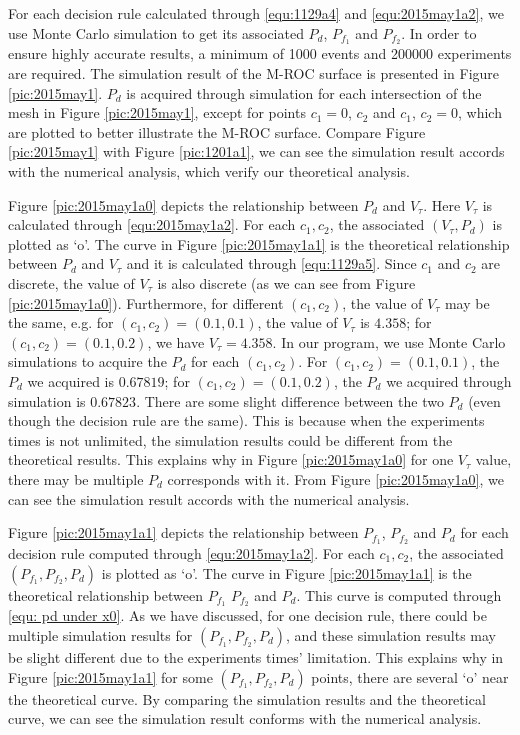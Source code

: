 For each decision rule calculated through \eqref{equ:1129a4} and \eqref{equ:2015may1a2}, we use Monte Carlo simulation to get its associated $P_d$, $P_{f_1}$ and $P_{f_2}$.   
In order to ensure highly accurate results, a minimum of 1000 events and 200000 experiments are required. The simulation result of the M-ROC surface is presented in Figure \ref{pic:2015may1}. $P_d$ is acquired through simulation for each intersection of the mesh in Figure \ref{pic:2015may1}, except for points $c_1 = 0$, $c_2$ and $c_1$, $c_2 = 0$, which are plotted to better illustrate the M-ROC surface. 
Compare Figure \ref{pic:2015may1} with Figure \ref{pic:1201a1}, we can see the simulation result accords with the numerical analysis, which verify our theoretical analysis.

Figure \ref{pic:2015may1a0} depicts the relationship between  $P_d$ and $V_\tau$. Here $V_\tau$ is calculated through \eqref{equ:2015may1a2}.  For each $c_1, c_2$, the associated $(V_\tau, P_d)$ is plotted as `o'. The curve in Figure \ref{pic:2015may1a1} is the theoretical relationship between $P_d$ and $V_\tau$ and it is calculated through \eqref{equ:1129a5}. 
Since $c_1$ and $c_2$ are discrete, the value of $V_\tau$ is also discrete (as we can see from Figure \ref{pic:2015may1a0}). Furthermore, for different $(c_1, c_2)$, the value of $V_\tau$ may be the same, 
e.g. for $(c_1, c_2) = (0.1, 0.1)$, the value of $V_\tau$ is $4.358$; for $(c_1, c_2) = (0.1, 0.2)$, we have $V_\tau = 4.358$.  
In our program, we use Monte Carlo simulations to acquire the $P_d$ for each $(c_1, c_2)$.  For  $(c_1, c_2) = (0.1, 0.1)$, the $P_d$ we acquired is $0.67819$; for $(c_1, c_2) = (0.1, 0.2)$, the $P_d$ we acquired through simulation is $0.67823$. There are some slight difference between the two $P_d$ (even though the decision rule are the same). This is because when the   experiments times is not unlimited, the simulation results could be different from the theoretical results. This explains why in Figure \ref{pic:2015may1a0} for one $V_\tau$ value, there may be multiple $P_d$ corresponds with it.  
From Figure \ref{pic:2015may1a0}, we can see the simulation result accords with the numerical analysis. 

Figure \ref{pic:2015may1a1} depicts the relationship between $P_{f_1}$, $P_{f_2}$ and $P_d$ for each decision rule computed through \eqref{equ:2015may1a2}.  
For each $c_1, c_2$, the associated $(P_{f_1}, P_{f_2}, P_d) $ is plotted as `o'.
The curve in Figure \ref{pic:2015may1a1} is the theoretical relationship between $P_{f_1}$ $P_{f_2}$ and $P_d$. This curve is computed through \eqref{equ: pd under x0}. 
As we have discussed, for one decision rule, there could be multiple simulation results for $(P_{f_1}, P_{f_2}, P_d)$, and these simulation results may be slight different due to the experiments times' limitation. 
This explains why in Figure \ref{pic:2015may1a1} for some $(P_{f_1}, P_{f_2}, P_d)$ points, there are several  `o' near the theoretical curve.
By comparing the simulation results and the theoretical curve, we can see the simulation result conforms with the numerical analysis. 


